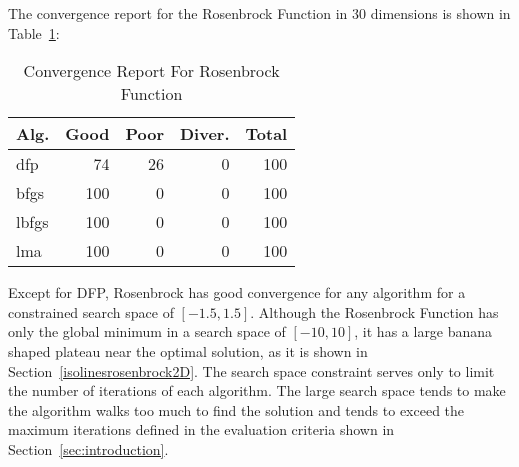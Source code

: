 
The convergence report for the Rosenbrock Function in 30 dimensions is shown in Table~\ref{convergence:rosenbrock2d}:

\begin{table}[H]
\centering
\caption{Convergence Report For Rosenbrock Function}
\label{convergence:rosenbrock2d}
\begin{tabular}{lrrrr}
\toprule
 Alg. &  Good &  Poor &  Diver. &  Total \\
\midrule
  dfp &    74 &    26 &       0 &    100 \\
 bfgs &   100 &     0 &       0 &    100 \\
lbfgs &   100 &     0 &       0 &    100 \\
  lma &   100 &     0 &       0 &    100 \\
\bottomrule
\end{tabular}
\end{table}

Except for DFP, Rosenbrock has good convergence for any algorithm for a constrained search space
of $\left[-1.5, 1.5\right]$. Although the Rosenbrock Function has only the global minimum in a
search space of $\left[-10, 10\right]$, it has a large banana shaped plateau near the optimal
solution, as it is shown in Section~\ref{isolinesrosenbrock2D}. The search space constraint serves
only to limit the number of iterations of each algorithm. The large search space tends to make the algorithm
walks too much to find the solution and tends to exceed the maximum iterations defined in the evaluation
criteria shown in Section~\ref{sec:introduction}.
